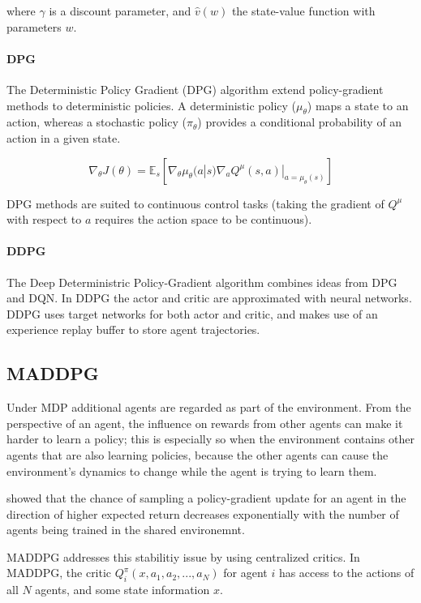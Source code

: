 \documentclass[11pt,a4paper]{article}
\begin{document}
where $\gamma$ is a discount parameter, and $\hat{v}(w)$ the state-value function with parameters $w$.

\paragraph{DPG} The Deterministic Policy Gradient (DPG) algorithm \citep{pmlr-v32-silver14} extend policy-gradient methods to deterministic policies.
A deterministic policy ($\mu_\theta$) maps a state to an action,
whereas a stochastic policy ($\pi_\theta$) provides a conditional probability of an action in a given state.

\begin{equation}
  \nabla_\theta J(\theta)=\mathbb{E}_s\left[\nabla_\theta \mu_\theta(a|s) \nabla_a Q^\mu(s,a)|_{a=\mu_\theta(s)}\right]
\end{equation}

DPG methods are suited to continuous control tasks
(taking the gradient of $Q^\mu$ with respect to $a$ requires the action space to be continuous).

\paragraph{DDPG} The Deep Deterministric Policy-Gradient algorithm \citep{lillicrap2019continuous} combines ideas from DPG and DQN.
In DDPG the actor and critic are approximated with neural networks.
DDPG uses target networks for both actor and critic, and makes use of an experience replay buffer to store agent trajectories.

\subsection{MADDPG}

Under MDP additional agents are regarded as part of the environment.
From the perspective of an agent, the influence on rewards from other agents can make it harder to learn a policy;
this is especially so when the environment contains other agents that are also learning policies,
because the other agents can cause the environment's dynamics to change while the agent is trying to learn them.

\citealp{lowe2020multiagent} showed that the chance of sampling a policy-gradient update for an agent in the direction of higher expected return decreases exponentially with the number of agents being trained in the shared environemnt.

MADDPG addresses this stabilitiy issue by using centralized critics.
In MADDPG, the critic $Q^\pi_i(x, a_1, a_2, ..., a_N)$ for agent $i$ has access to the actions of all $N$ agents, and some state information $x$.
\end{document}
